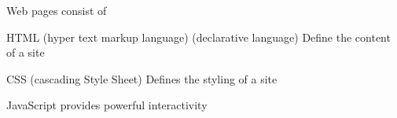 Web pages consist of 

  HTML   (hyper text markup language) (declarative language)
    Define the content of a site 

  CSS  (cascading Style Sheet) 
    Defines the styling of a site 

  JavaScript 
    provides powerful interactivity 


